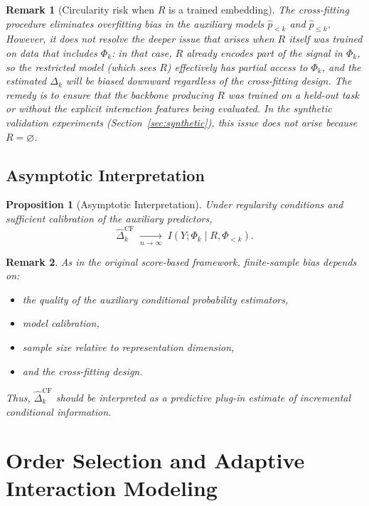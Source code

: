 \documentclass[11pt]{article}
\newtheorem{proposition}{Proposition}
\newtheorem{remark}{Remark}
\newcommand{\1}{\mathbf{1}}
\begin{document}
\begin{remark}[Circularity risk when $R$ is a trained embedding]
The cross-fitting procedure eliminates overfitting bias in the auxiliary models
$\hat p_{<k}$ and $\hat p_{\le k}$.
However, it does \emph{not} resolve the deeper issue that arises when $R$ itself was trained on
data that includes $\Phi_k$: in that case, $R$ already encodes part of the signal in $\Phi_k$,
so the restricted model (which sees $R$) effectively has partial access to $\Phi_k$, and the
estimated $\Delta_k$ will be biased downward regardless of the cross-fitting design.
The remedy is to ensure that the backbone producing $R$ was trained on a held-out task or without
the explicit interaction features being evaluated.
In the synthetic validation experiments (Section~\ref{sec:synthetic}), this issue does not arise
because $R = \varnothing$.
\end{remark}

\subsection{Asymptotic Interpretation}

\begin{proposition}[Asymptotic Interpretation]
Under regularity conditions and sufficient calibration of the auxiliary predictors,
\begin{equation}
\widehat{\Delta}^{\mathrm{CF}}_k
\;\xrightarrow[n\to\infty]{}\;
I(Y;\Phi_k\mid R,\Phi_{<k}).
\label{eq:asymptotic_consistency}
\end{equation}
\end{proposition}

\begin{remark}
As in the original score-based framework, finite-sample bias depends on:
\begin{itemize}[leftmargin=1.5em]
    \item the quality of the auxiliary conditional probability estimators,
    \item model calibration,
    \item sample size relative to representation dimension,
    \item and the cross-fitting design.
\end{itemize}
Thus, $\widehat{\Delta}^{\mathrm{CF}}_k$ should be interpreted as a
\emph{predictive plug-in estimate of incremental conditional information}.
\end{remark}

\section{Order Selection and Adaptive Interaction Modeling}
\end{document}
